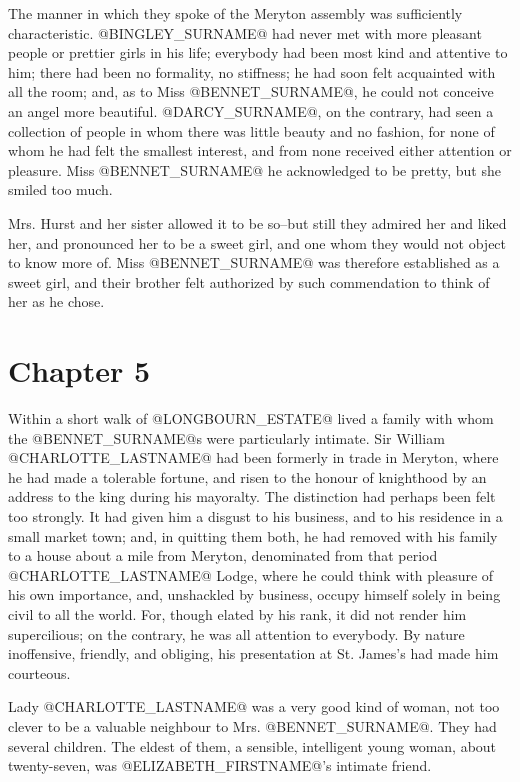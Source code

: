 The manner in which they spoke of the Meryton assembly was sufficiently
characteristic. @BINGLEY_SURNAME@ had never met with more pleasant people or
prettier girls in his life; everybody had been most kind and attentive
to him; there had been no formality, no stiffness; he had soon felt
acquainted with all the room; and, as to Miss @BENNET_SURNAME@, he could not
conceive an angel more beautiful. @DARCY_SURNAME@, on the contrary, had seen a
collection of people in whom there was little beauty and no fashion, for
none of whom he had felt the smallest interest, and from none received
either attention or pleasure. Miss @BENNET_SURNAME@ he acknowledged to be pretty,
but she smiled too much.

Mrs. Hurst and her sister allowed it to be so--but still they admired
her and liked her, and pronounced her to be a sweet girl, and one
whom they would not object to know more of. Miss @BENNET_SURNAME@ was therefore
established as a sweet girl, and their brother felt authorized by such
commendation to think of her as he chose.



\chapter*{Chapter 5}


Within a short walk of @LONGBOURN_ESTATE@ lived a family with whom the @BENNET_SURNAME@s
were particularly intimate. Sir William @CHARLOTTE_LASTNAME@ had been formerly in trade
in Meryton, where he had made a tolerable fortune, and risen to the
honour of knighthood by an address to the king during his mayoralty.
The distinction had perhaps been felt too strongly. It had given him a
disgust to his business, and to his residence in a small market town;
and, in quitting them both, he had removed with his family to a house
about a mile from Meryton, denominated from that period @CHARLOTTE_LASTNAME@ Lodge,
where he could think with pleasure of his own importance, and,
unshackled by business, occupy himself solely in being civil to all
the world. For, though elated by his rank, it did not render him
supercilious; on the contrary, he was all attention to everybody. By
nature inoffensive, friendly, and obliging, his presentation at St.
James's had made him courteous.

Lady @CHARLOTTE_LASTNAME@ was a very good kind of woman, not too clever to be a
valuable neighbour to Mrs. @BENNET_SURNAME@. They had several children. The eldest
of them, a sensible, intelligent young woman, about twenty-seven, was
@ELIZABETH_FIRSTNAME@'s intimate friend.

